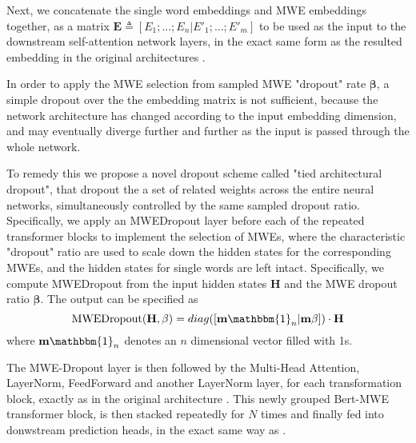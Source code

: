 Next, we concatenate the single word embeddings and MWE embeddings together, as
a matrix $\mathbf{E} \triangleq [E_1; ...; E_n| E'_1; ...; E'_m]$ to be used as the input to the downstream self-attention network layers, 
in the exact same form as the resulted embedding in the original architectures
\cite{vaswani2017attention}.





In order to apply the MWE selection from sampled MWE "dropout" rate $\bm{\beta}$, a simple dropout over the the embedding matrix is not sufficient, because the network architecture has changed according to the input embedding dimension, 
and may eventually diverge further and further as the input is passed through the whole network.

To remedy this we propose a novel dropout scheme called "tied architectural dropout", that dropout the a set of related weights across the entire neural networks, simultaneously controlled by the same sampled dropout ratio.
Specifically, we apply an MWEDropout layer 
before each of the repeated transformer blocks\cite{devlin2018bert}
to implement the selection of MWEs, where the characteristic "dropout" ratio are used to scale down the hidden states for the corresponding MWEs, and the hidden states for single words are left intact.  
Specifically, we compute MWEDropout from the input hidden states $\mathbf{H}$ and the MWE dropout ratio $\bm{\beta}$. 
The output can be specified as 
\begin{equation}
   \mathrm{MWEDropout}(\mathbf{H}, \mathbf{\beta}) =  diag([\bm{{\mathbbm{1}}}_n \vert \bm{\beta}]) \cdot \mathbf{H}
\end{equation}
where $\bm{{\mathbbm{1}}}_n$ denotes an $n$ dimensional vector filled with 1s.

The MWE-Dropout layer is then followed by the Multi-Head Attention, LayerNorm, FeedForward and another LayerNorm layer, for each transformation block, exactly as in the original architecture \cite{vaswani2017attention}. This newly grouped Bert-MWE transformer block, is then stacked repeatedly for $N$ times and finally fed into donwstream prediction heads, in the exact same way as \cite{devlin2018bert}.




